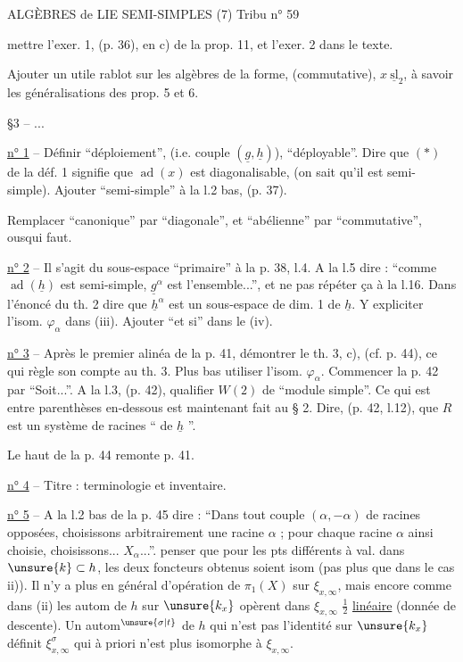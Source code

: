ALGÈBRES de LIE SEMI-SIMPLES (7) \hfill Tribu n° 59

mettre l'exer. 1, (p. 36), en c) de la prop. 11, et l'exer. 2 dans le texte.

Ajouter un utile rablot sur les algèbres de la forme, (commutative), $x\ \underline{\mathrm{sl}}_2$, à savoir les généralisations des prop. 5 et 6.

§3 -- ...

\uline{n° 1} -- Définir ``déploiement'', (i.e. couple $(\underline{g},\underline{h})$), ``déployable''. Dire que $(*)$ de la déf. 1 signifie que $\operatorname{ad}(x)$ est diagonalisable, (on sait qu'il est semi-simple). Ajouter ``semi-simple'' à la l.2 bas, (p. 37).

Remplacer ``canonique'' par ``diagonale'', et ``abélienne'' par ``commutative'', ousqui faut.

\uline{n° 2} -- Il s'agit du sous-espace ``primaire'' à la p. 38, l.4. A la l.5 dire : ``comme $\operatorname{ad}(\underline{h})$ est semi-simple, $\underline{g}^{\alpha}$ est l'ensemble...'', et ne pas répéter ça à la l.16. Dans l'énoncé du th. 2 dire que $\underline{h}^{\alpha}$ est un sous-espace de dim. 1 de $\underline{h}$. Y expliciter l'isom. $\varphi_{\alpha}$ dans (iii). Ajouter ``et si'' dans le (iv).

\uline{n° 3} -- Après le premier alinéa de la p. 41, démontrer le th. 3, c), (cf. p. 44), ce qui règle son compte au th. 3. Plus bas utiliser l'isom. $\varphi_{\alpha}$. Commencer la p. 42 par ``Soit...''. A la l.3, (p. 42), qualifier $W(2)$ de ``module simple''. Ce qui est entre parenthèses en-dessous est maintenant fait au § 2. Dire, (p. 42, l.12), que $R$ est un système de racines `` de $\underline{h}$ ''.

Le haut de la p. 44 remonte p. 41.

\uline{n° 4} -- Titre : terminologie et inventaire.

\uline{n° 5} -- A la l.2 bas de la p. 45 dire : ``Dans tout couple $(\alpha,-\alpha)$ de racines opposées, choisissons arbitrairement une racine $\alpha$ ; pour chaque racine $\alpha$ ainsi choisie, choisissons... $X_{\alpha}$...''.
penser que pour les pts différents à val. dans $\unsure{k}\subset h$, les deux foncteurs obtenus soient isom (pas plus que dans le cas ii)). Il n'y a plus en général d'opération de $\pi_1(X)$ sur $\xi_{x,\infty}$, mais encore comme dans (ii) les autom de $h$ sur $\unsure{k_x}$ opèrent dans $\xi_{x,\infty}$ $\frac12$ \uline{linéaire} (donnée de descente). Un autom$^{\unsure{\sigma|t}}$ de $h$ qui n'est pas l'identité sur $\unsure{k_x}$ définit $\xi_{x,\infty}^{\sigma}$ qui à priori n'est plus isomorphe à $\xi_{x,\infty}$.

